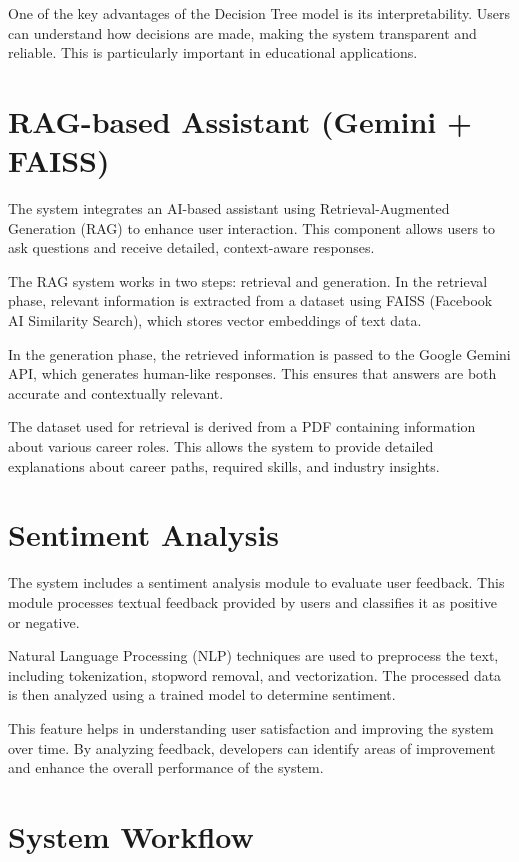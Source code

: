 \documentclass[12pt,a4paper]{report}
\begin{document}
{One of the key advantages of the Decision Tree model is its interpretability. Users can understand how decisions are made, making the system transparent and reliable. This is particularly important in educational applications.

\section{RAG-based Assistant (Gemini + FAISS)}

The system integrates an AI-based assistant using Retrieval-Augmented Generation (RAG) to enhance user interaction. This component allows users to ask questions and receive detailed, context-aware responses.

The RAG system works in two steps: retrieval and generation. In the retrieval phase, relevant information is extracted from a dataset using FAISS (Facebook AI Similarity Search), which stores vector embeddings of text data.

In the generation phase, the retrieved information is passed to the Google Gemini API, which generates human-like responses. This ensures that answers are both accurate and contextually relevant.

The dataset used for retrieval is derived from a PDF containing information about various career roles. This allows the system to provide detailed explanations about career paths, required skills, and industry insights.

\section{Sentiment Analysis}

The system includes a sentiment analysis module to evaluate user feedback. This module processes textual feedback provided by users and classifies it as positive or negative.

Natural Language Processing (NLP) techniques are used to preprocess the text, including tokenization, stopword removal, and vectorization. The processed data is then analyzed using a trained model to determine sentiment.

This feature helps in understanding user satisfaction and improving the system over time. By analyzing feedback, developers can identify areas of improvement and enhance the overall performance of the system.

\section{System Workflow}

}
\end{document}
